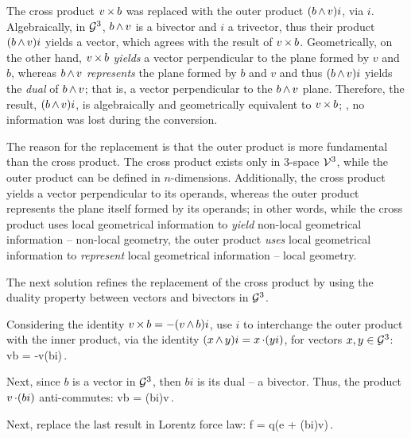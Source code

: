 \begin{note} The cross product $v\operatorname{\times} b$ was replaced with the outer product $(b\operatorname{\wedge} v)i$, via $i$. Algebraically, in $\mathcal{G}^{3}$, $b\operatorname{\wedge} v$ is a bivector and $i$ a trivector, thus their product $(b\operatorname{\wedge} v)i$ yields a vector, which agrees with the result of $v\operatorname{\times} b$. Geometrically, on the other hand, $v\operatorname{\times} b$ \emph{yields} a vector perpendicular to the plane formed by $v$ and $b$, whereas $b\operatorname{\wedge} v$ \emph{represents} the plane formed by $b$ and $v$ and thus $(b\operatorname{\wedge} v)i$ yields the \emph{dual} of $b\operatorname{\wedge} v$; that is, a vector perpendicular to the $b\operatorname{\wedge} v$ plane. Therefore, the result, $(b\operatorname{\wedge} v)i$, is algebraically and geometrically equivalent to $v\operatorname{\times} b$; \ie, no information was lost during the conversion.

The reason for the replacement is that the outer product is more fundamental than the cross product. The cross product exists only in 3-space $\mathcal{V}^{3}$, while the outer product can be defined in $n$-dimensions. Additionally, the cross product yields a vector perpendicular to its operands, whereas the outer product represents the plane itself formed by its operands; in other words, while the cross product uses local geometrical information to \emph{yield} non-local geometrical information -- non-local geometry, the outer product \emph{uses} local geometrical information to \emph{represent} local geometrical information -- local geometry.
\end{note}

The next solution refines the replacement of the cross product by using the duality property between vectors and bivectors in $\mathcal{G}^{3}$.

\begin{solution}
Considering the identity $v\operatorname{\times} b = -(v\operatorname{\wedge} b)i$, use $i$ to interchange the outer product with the inner product, via the identity $(x\operatorname{\wedge} y)i = x\operatorname{\cdot}(yi)$, for vectors $x,y\in\mathcal{G}^{3}$:
\beq
v\cprod b = -v\iprod(bi)\,.
\eeq

Next, since $b$ is a vector in $\mathcal{G}^{3}$, then $bi$ is its dual -- a bivector. Thus, the product $v\operatorname{\cdot}(bi)$ anti-commutes:
\beq
v\cprod b = (bi)\iprod v\,.
\eeq

Next, replace the last result in Lorentz force law:
\beq
f = q(e + (bi)\iprod v)\,.\mqed
\eeq
\end{solution}
